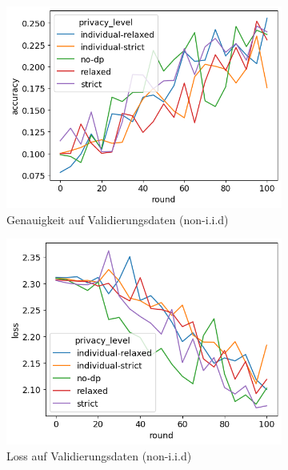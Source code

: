 \begin{figure}[tb]
	\centering
	\begin{subfigure}{0.45\textwidth}
		\centering
		\includegraphics[width=\textwidth]{Bilder/cifar10-accuracy.png}
		\caption{Genauigkeit auf Validierungsdaten (non-i.i.d)}
	\end{subfigure}
	\begin{subfigure}{0.45\textwidth}
		\centering
		\includegraphics[width=\textwidth]{Bilder/cifar10-loss.png}
		\caption{Loss auf Validierungsdaten (non-i.i.d)}
	\end{subfigure}
	\begin{subfigure}{0.45\textwidth}
		\centering

\end{subfigure}
\end{figure}

